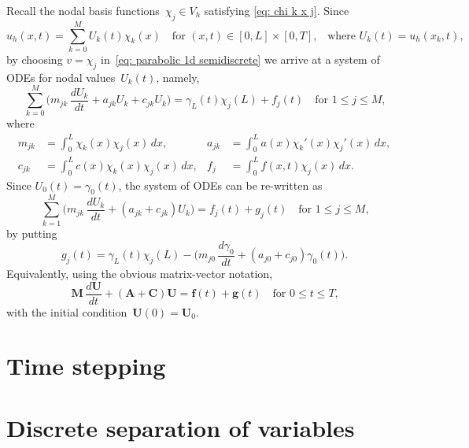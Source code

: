 Recall the nodal basis functions~$\chi_j\in V_h$ satisfying 
\eqref{eq: chi k x j}.  Since
\[
u_h(x,t)=\sum_{k=0}^MU_k(t)\chi_k(x)
	\quad\text{for $(x,t)\in[0,L]\times[0,T]$,}
	\quad\text{where $U_k(t)=u_h(x_k,t)$,}
\]
by choosing $v=\chi_j$ in~\eqref{eq: parabolic 1d semidiscrete} we arrive at a 
system of ODEs for nodal values~$U_k(t)$, namely,
\[
\sum_{k=0}^M\biggl(m_{jk}\,\frac{dU_k}{dt}+a_{jk}U_k+c_{jk}U_k\biggr)
	=\gamma_L(t)\chi_j(L)+f_j(t)\quad\text{for $1\le j\le M$,}
\]
where
\begin{align*}
m_{jk}&=\int_0^L\chi_k(x)\chi_j(x)\,dx,&
a_{jk}&=\int_0^La(x)\chi_k'(x)\chi_j'(x)\,dx,\\
c_{jk}&=\int_0^Lc(x)\chi_k(x)\chi_j(x)\,dx,&
f_j&=\int_0^Lf(x,t)\chi_j(x)\,dx.
\end{align*}
Since $U_0(t)=\gamma_0(t)$, the system of ODEs can be re-written as
\[
\sum_{k=1}^M\biggl(m_{jk}\,\frac{dU_k}{dt}+(a_{jk}+c_{jk})U_k\biggr)
	=f_j(t)+g_j(t)\quad\text{for $1\le j\le M$,}
\]
by putting
\[
g_j(t)=\gamma_L(t)\chi_j(L)-\biggl(m_{j0}\,\frac{d\gamma_0}{dt}
	+(a_{j0}+c_{j0})\gamma_0(t)\biggr).
\]
Equivalently, using the obvious matrix-vector notation,
\[
\boldsymbol{M}\,\frac{d\boldsymbol{U}}{dt}
	+(\boldsymbol{A}+\boldsymbol{C})\boldsymbol{U}
	=\boldsymbol{f}(t)+\boldsymbol{g}(t)\quad\text{for $0\le t\le T$,}
\]
with the initial condition~$\boldsymbol{U}(0)=\boldsymbol{U}_0$.





\section{Time stepping}

\section{Discrete separation of variables}
